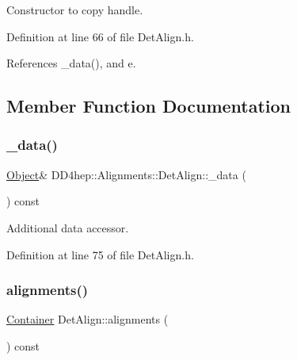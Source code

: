 Constructor to copy handle. 



Definition at line 66 of file Det\+Align.\+h.



References \+\_\+data(), and e.



\subsection{Member Function Documentation}
\hypertarget{class_d_d4hep_1_1_alignments_1_1_det_align_ab9e717eb37be61db43a980df0a91b57b}{}\label{class_d_d4hep_1_1_alignments_1_1_det_align_ab9e717eb37be61db43a980df0a91b57b} 
\subsubsection{\texorpdfstring{\+\_\+data()}{\_data()}}
{\footnotesize\ttfamily \hyperlink{class_d_d4hep_1_1_alignments_1_1_det_align_ae49c039feb46ce85c64fecb6cf669f45}{Object}\& D\+D4hep\+::\+Alignments\+::\+Det\+Align\+::\+\_\+data (\begin{DoxyParamCaption}{ }\end{DoxyParamCaption}) const\hspace{0.3cm}{\ttfamily [inline]}}



Additional data accessor. 



Definition at line 75 of file Det\+Align.\+h.

\hypertarget{class_d_d4hep_1_1_alignments_1_1_det_align_ad89f0c712ae4b6cb78d2e92a30ac5742}{}\label{class_d_d4hep_1_1_alignments_1_1_det_align_ad89f0c712ae4b6cb78d2e92a30ac5742} 
\subsubsection{\texorpdfstring{alignments()}{alignments()}}
{\footnotesize\ttfamily \hyperlink{class_d_d4hep_1_1_alignments_1_1_container}{Container} Det\+Align\+::alignments (\begin{DoxyParamCaption}{ }\end{DoxyParamCaption}) const}



